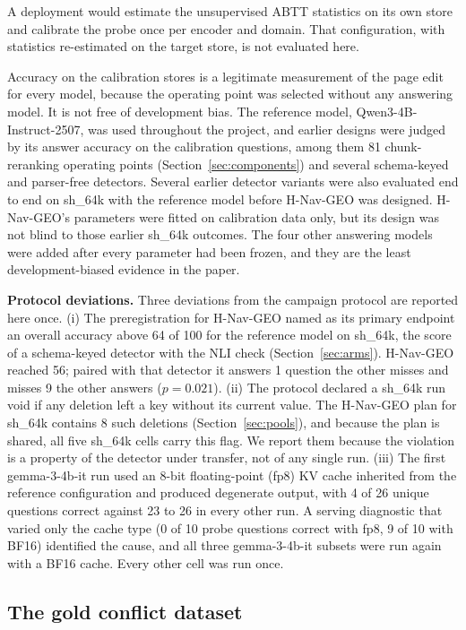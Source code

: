 \documentclass{CUP-JNL-NLP}
\newcommand{\sub}[1]{\textsf{sh\_#1}}                    %
\newcommand{\geo}{H-Nav-GEO}
\begin{document}
A deployment would estimate the unsupervised ABTT statistics on its own store and calibrate the probe once per encoder and domain. That configuration, with statistics re-estimated on the target store, is not evaluated here.

Accuracy on the calibration stores is a legitimate measurement of the page edit for every model, because the operating point was selected without any answering model. It is not free of development bias. The reference model, Qwen3-4B-Instruct-2507, was used throughout the project, and earlier designs were judged by its answer accuracy on the calibration questions, among them 81 chunk-reranking operating points (Section~\ref{sec:components}) and several schema-keyed and parser-free detectors. Several earlier detector variants were also evaluated end to end on \sub{64k} with the reference model before \geo{} was designed. \geo{}'s parameters were fitted on calibration data only, but its design was not blind to those earlier \sub{64k} outcomes. The four other answering models were added after every parameter had been frozen, and they are the least development-biased evidence in the paper.

\textbf{Protocol deviations.} Three deviations from the campaign protocol are reported here once. (i) The preregistration for \geo{} named as its primary endpoint an overall accuracy above 64 of 100 for the reference model on \sub{64k}, the score of a schema-keyed detector with the NLI check (Section~\ref{sec:arms}). \geo{} reached 56; paired with that detector it answers 1 question the other misses and misses 9 the other answers ($p=0.021$). (ii) The protocol declared a \sub{64k} run void if any deletion left a key without its current value. The \geo{} plan for \sub{64k} contains 8 such deletions (Section~\ref{sec:pools}), and because the plan is shared, all five \sub{64k} cells carry this flag. We report them because the violation is a property of the detector under transfer, not of any single run. (iii) The first gemma-3-4b-it run used an 8-bit floating-point (fp8) KV cache inherited from the reference configuration and produced degenerate output, with 4 of 26 unique questions correct against 23 to 26 in every other run. A serving diagnostic that varied only the cache type (0 of 10 probe questions correct with fp8, 9 of 10 with BF16) identified the cause, and all three gemma-3-4b-it subsets were run again with a BF16 cache. Every other cell was run once.

\subsection{The gold conflict dataset}
\label{sec:gold}
\end{document}
